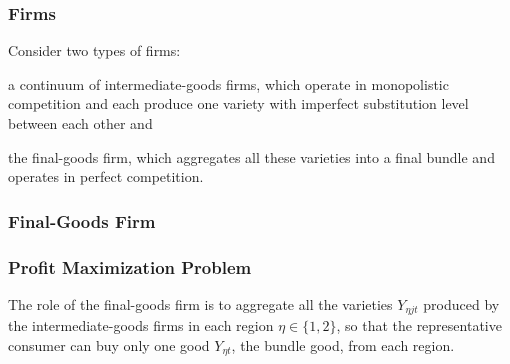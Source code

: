 \documentclass[../thesis.tex]{subfiles}
\begin{document}


\subsubsection*{Firms}

Consider two types of firms: 
\begin{enumerate*}[label=(\arabic*)]
	\item a continuum of intermediate-goods firms, which operate in monopolistic competition and each produce one variety with imperfect substitution level between each other and
	\item the final-goods firm, which aggregates all these varieties into a final bundle and operates in perfect competition.
\end{enumerate*}


\subsubsection{Final-Goods Firm}

\subsubsection*{Profit Maximization Problem}

The role of the final-goods firm is to aggregate all the varieties $Y_{\eta jt}$ produced by the intermediate-goods firms in each region $\eta \in \{1,2\}$, so that the representative consumer can buy only one good $Y_{\eta t}$, the bundle good, from each region.


\end{document}
